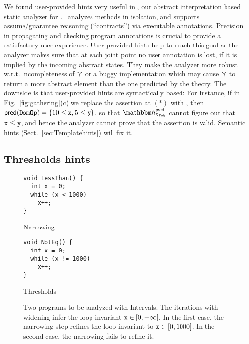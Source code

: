 \documentclass{llncs}
\newcommand{\sopra}{\vspace{-.3cm}}
\begin{document}
We found user-provided hints very useful in \Clousot, our abstract interpretation based static analyzer for \NET.
\Clousot\ analyzes methods in isolation, and supports assume/guarantee
reasoning (``contracts'') via executable annotations.
Precision in propagating and checking program annotations is crucial to provide a satisfactory user experience.
User-provided hints help to reach this goal as the analyzer makes sure that at each joint point no user annotation is lost, if it is implied by the incoming abstract states.
They make the analyzer more robust w.r.t. incompleteness of $\curlyvee$ or a buggy implementation which may cause $\curlyvee$ to return a more abstract element than the one predicted by the theory.
The downside is that user-provided hints are syntactically based:
For instance, if in Fig.~\ref{fig:gathering}(c) we replace the assertion at $\mathtt{(*)}$ with , then $\mathsf{pred}(\mathtt{DomOp}) =  \{ 10 \leq \mathtt{x} , 5 \leq \mathtt{y} \}$, so that  $\hint{\widening_{\Poly}}^{\mathsf{pred}}$ cannot figure out that $\mathtt{x} \leq \mathtt{y}$, and hence the analyzer cannot prove that the assertion is valid.
Semantic hints (Sect.~\ref{sec:Templatehints}) will fix it. 




\subsection{Thresholds hints}
\begin{figure}[t]
\centering
\begin{subfloat}
  \begin{minipage}{3cm}
\begin{verbatim}
void LessThan() {
  int x = 0;
  while (x < 1000) 
    x++;
}
\end{verbatim}
  \end{minipage}
  \caption{Narrowing}
  \label{fig:tresholds1}
\end{subfloat}    
\qquad \qquad
\begin{subfloat}
  \begin{minipage}{3cm}
\begin{verbatim}
void NotEq() {
  int x = 0;
  while (x != 1000) 
    x++;
}
\end{verbatim}
  \end{minipage}
  \caption{Thresholds}
  \label{fig:tresholds2}
\end{subfloat}

\caption{Two programs to be analyzed with Intervals.
  The iterations with widening infer the loop invariant $\mathtt{x} \in [0,+\infty]$.
  In the first case, the narrowing step refines the loop invariant to $\mathtt{x} \in [0, 1000]$.
  In the second case, the narrowing fails to refine it.}
\label{fig:tresholds}
\sopra
\end{figure}
\end{document}
